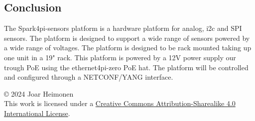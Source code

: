 \documentclass[12pt]{article}
\newcommand{\license}{
    \vspace{1em}
    \noindent\small{© 2024 Joar Heimonen\\
    This work is licensed under a \href{https://creativecommons.org/licenses/by-sa/4.0/}{Creative Commons Attribution-Sharealike 4.0 International License}.}
    \vspace{1em}
}
\begin{document}
\subsection{Conclusion}
The Spark4pi-sensors platform is a hardware platform for analog, i2c and SPI sensors. The platform is designed to support a wide range of sensors powered by a wide range of voltages.
The platform is designed to be rack mounted taking up one unit in a 19" rack. This platform is powered by a 12V power supply our trough PoE using the ethernet4pi-zero PoE hat.
The platform will be controlled and configured through a NETCONF/YANG interface.


\pagebreak
{}
\printbibliography
\license
\end{document}
